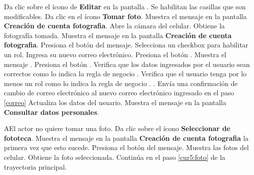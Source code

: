  \begin{UCtrayectoria}
 	
 	\UCpaso [\UCactor] Da clic sobre el ícono de \textbf{Editar} en la pantalla .
 	\UCpaso Se habilitan las casillas que son modificables. 	
 	\UCpaso [\UCactor] Da clic en el ícono \textbf{Tomar foto}. 
 	\UCpaso Muestra el mensaje  en la pantalla \textbf{Creación de cuenta fotografia}.
 	\UCpaso Abre la cámara del celular.\label{cur:otrafoto}
 	\UCpaso Obtiene la fotografía tomada.
 	\UCpaso Muestra el mensaje  en la pantalla \textbf{Creación de cuenta fotografia}.
 	\UCpaso [\UCactor] Presiona el botón  del mensaje.
 	\UCpaso [\UCactor] Selecciona un checkbox para habilitar un rol.   \label{roles}
 	\UCpaso [\UCactor] Ingresa su nuevo correo electrónico.  \label{correo}
 	\UCpaso [\UCactor] Presiona el botón .
 	\UCpaso Muestra el mensaje .
 	\UCpaso [\UCactor] Presiona el botón .
 	\UCpaso Verifica que los datos ingresados por el usuario sean correctos como lo indica la regla de negocio . 
 	\UCpaso Verifica que el usuario tenga por lo menos un rol como lo indica la regla de negocio . .
 	\UCpaso Envía una confirmación de cambio de correo electrónico al nuevo correo electrónico ingresado en el paso \ref{correo}
 	\UCpaso Actualiza los datos del usuario.
 	\UCpaso Muestra el mensaje  en la pantalla \textbf{Consultar datos personales}.
 	
 	 
 	

 \end{UCtrayectoria}

 \begin{UCtrayectoriaA}{A}{El actor no quiere tomar una foto.}
 	\UCpaso [\UCactor] Da clic sobre el ícono \textbf{Seleccionar de fototeca}.
 	\UCpaso Muestra el mensaje  en la pantalla \textbf{Creación de cuenta fotografia} la primera vez que esto sucede.
 	\UCpaso [\UCactor] Presiona el botón  del mensaje.
 	\UCpaso Muestra las fotos del celular.
 	\UCpaso Obtiene la foto seleccionada.
 	\UCpaso Continúa en el paso \ref{cur5:foto} de la trayectoria principal.
 	
 \end{UCtrayectoriaA}

